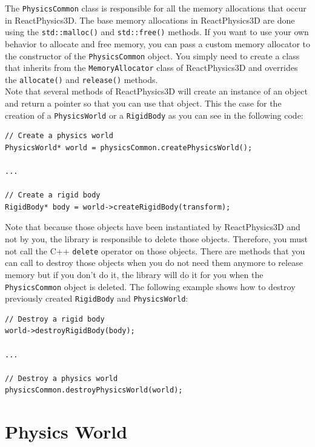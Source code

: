 \documentclass[a4paper,12pt]{article}
\begin{document}
   The \texttt{PhysicsCommon} class is responsible for all the memory allocations that occur in ReactPhysics3D. The base memory allocations in ReactPhysics3D
   are done using the \texttt{std::malloc()} and \texttt{std::free()} methods. If you want to use your own behavior to allocate and free memory, you can pass
   a custom memory allocator to the constructor of the \texttt{PhysicsCommon} object. You simply need to create a class that inherits from the
   \texttt{MemoryAllocator} class of ReactPhysics3D and overrides the \texttt{allocate()} and \texttt{release()} methods. \\

   Note that several methods of ReactPhysics3D will create an instance of an object and return a pointer so that you can use that object. This the case
   for the creation of a \texttt{PhysicsWorld} or a \texttt{RigidBody} as you can see in the following code: \\

   \begin{lstlisting}
// Create a physics world
PhysicsWorld* world = physicsCommon.createPhysicsWorld();

...

// Create a rigid body
RigidBody* body = world->createRigidBody(transform);
   \end{lstlisting}

   \vspace{0.6cm}

   Note that because those objects have been instantiated by ReactPhysics3D and not by you, the library is responsible to delete those objects. Therefore,
   you must not call the C++ \texttt{delete} operator on those objects. There are methods that you can call to destroy those objects when you do not need
   them anymore to release memory but if you don't do it, the library will do it for you when the \texttt{PhysicsCommon} object is deleted. The
   following example shows how to destroy previously created \texttt{RigidBody} and \texttt{PhysicsWorld}: \\

   \begin{lstlisting}
// Destroy a rigid body
world->destroyRigidBody(body);

...

// Destroy a physics world
physicsCommon.destroyPhysicsWorld(world);
   \end{lstlisting}

   \section{Physics World}
     \label{sec:physicsworld}
\end{document}
